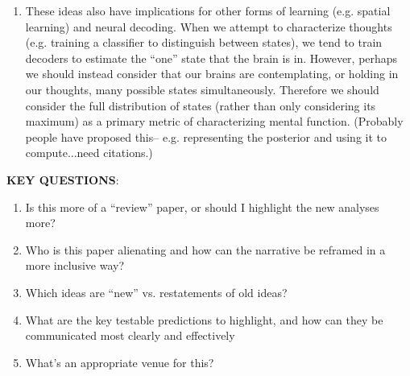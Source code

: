 \documentclass{article}
\begin{document}
\begin{enumerate}
    \item These ideas also have implications for other forms of learning (e.g. spatial learning) and neural decoding.  When we attempt to characterize thoughts (e.g. training a classifier to distinguish between states), we tend to train decoders to estimate the ``one'' state that the brain is in.  However, perhaps we should instead consider that our brains are contemplating, or holding in our thoughts, many possible states simultaneously.  Therefore we should consider the full distribution of states (rather than only considering its maximum) as a primary metric of characterizing mental function.  (Probably people have proposed this-- e.g. representing the posterior and using it to compute...need citations.)
    \end{enumerate}

\textbf{KEY QUESTIONS}:
\begin{enumerate}
  \item Is this more of a ``review'' paper, or should I highlight the new analyses more?
  \item Who is this paper alienating and how can the narrative be reframed in a more inclusive way?
  \item Which ideas are ``new'' vs. restatements of old ideas?
  \item What are the key testable predictions to highlight, and how can they be communicated most clearly and effectively
  \item What's an appropriate venue for this?
\end{enumerate}
\end{document}
